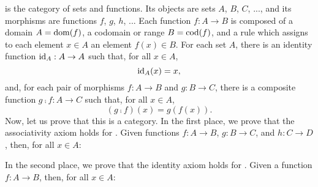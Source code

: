 \begin{example}
  \label{ex:category-set}


  \set is the category of sets and functions. Its objects are sets
  $A$, $B$, $C$, ..., and its morphisms are functions $f$, $g$, $h$,
  ... Each function $f: A \to B$ is composed of a domain $A =
  \operatorname{dom}(f)$, a codomain or range $B = \operatorname{cod}(f)$, and a rule which
  assigns to each element $x \in A$ an element $f(x) \in B$. For each
  set $A$, there is an identity function $\operatorname{id}_{A}: A \to A$ such that,
  for all $x \in A$,
  \begin{equation}
    \label{eq:set-identity}
    \operatorname{id}_{A}(x) = x
    \text{,}
  \end{equation}
  and, for each pair of morphisms $f: A \to B$ and $g: B \to C$, there
  is a composite function $g \comp f: A \to C$ such that, for all $x
  \in A$,
  \begin{equation}
    \label{eq:set-composition}
    (g \comp f)(x) = g(f(x))
    \text{.}
  \end{equation}
  Now, let us prove that this is a category. In the first place, we
  prove that the associativity axiom holds for \set. Given functions
  $f: A \to B$, $g: B \to C$, and $h: C \to D$, then, for all $x \in
  A$:
  \begin{steps}
      \eqby{\eqref{eq:set-composition}}
      \eqby{\eqref{eq:set-composition}}
      \eqby{\eqref{eq:set-composition}}
      \eqby{\eqref{eq:set-composition}}
  \end{steps}
  In the second place, we prove that the identity axiom holds for
  \set. Given a function $f: A \to B$, then, for all $x \in A$:
  \begin{steps}
      \eqby{\eqref{eq:set-composition}}
      \eqby{\eqref{eq:set-identity}}
      \eqby{\eqref{eq:set-identity}}
      \eqby{\eqref{eq:set-composition}}
  \end{steps}

  \begin{remark}
    \label{re:foundations}




\end{remark}
\end{example}

